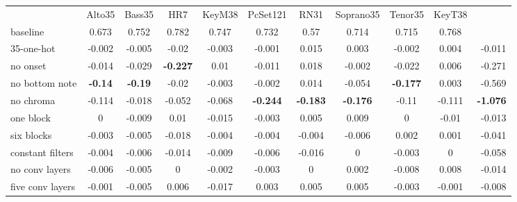 \begin{tabular}{lcccccccccr}
                    & Alto35         & Bass35         & HR7             & KeyM38          & PcSet121        & RN31            & Soprano35       & Tenor35         & KeyT38          & \multicolumn{1}{l}{} \\
baseline            & 0.673          & 0.752          & 0.782           & 0.747           & 0.732           & 0.57            & 0.714           & 0.715           & 0.768           & \multicolumn{1}{l}{} \\
35-one-hot          & -0.002         & -0.005         & -0.02           & -0.003          & -0.001          & 0.015           & 0.003           & -0.002          & 0.004           & -0.011               \\
no onset            & -0.014         & -0.029         & \textbf{-0.227} & 0.01            & -0.011          & 0.018           & -0.002          & -0.022          & 0.006           & -0.271               \\
no bottom note      & \textbf{-0.14} & \textbf{-0.19} & -0.02           & -0.003          & -0.002          & 0.014           & -0.054          & \textbf{-0.177} & 0.003           & -0.569               \\
no chroma           & -0.114         & -0.018         & -0.052          & -0.068          & \textbf{-0.244} & \textbf{-0.183} & \textbf{-0.176} & -0.11           & -0.111          & \textbf{-1.076}      \\
one block           & 0              & -0.009         & 0.01            & -0.015          & -0.003          & 0.005           & 0.009           & 0               & -0.01           & -0.013               \\
six blocks          & -0.003         & -0.005         & -0.018          & -0.004          & -0.004          & -0.004          & -0.006          & 0.002           & 0.001           & -0.041               \\
constant filters    & -0.004         & -0.006         & -0.014          & -0.009          & -0.006          & -0.016          & 0               & -0.003          & 0               & -0.058               \\
no conv layers      & -0.006         & -0.005         & 0               & -0.002          & -0.003          & 0               & 0.002           & -0.008          & 0.008           & -0.014               \\
five conv layers    & -0.001         & -0.005         & 0.006           & -0.017          & 0.003           & 0.005           & 0.005           & -0.003          & -0.001          & -0.008               \\

\end{tabular}
